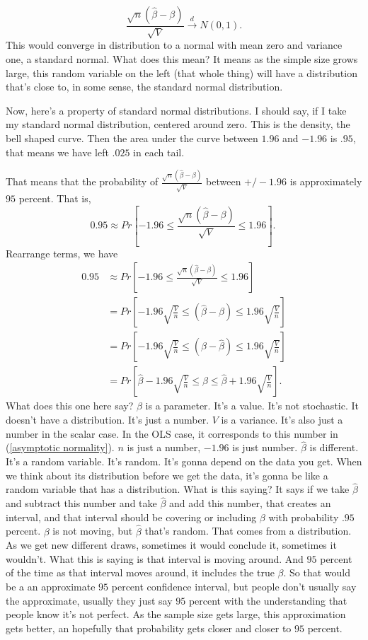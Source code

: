 \documentclass[11pt,a4paper]{amsart}
\theoremstyle{plain}
\theoremstyle{definition}
\begin{document}
	\[		\frac{\sqrt{n}(\hat{\beta} - \beta)}{\sqrt{V}} \stackrel{d}{\longrightarrow} N(0,1).	\]
	This would converge in distribution to a normal with mean zero and variance one, a standard normal. What does this mean? It means as the simple size grows large, this random variable on the left (that whole thing) will have a distribution that's close to, in some sense, the standard normal distribution.\par 
	Now, here's a property of standard normal distributions. I should say, if I take my standard normal distribution, centered around zero. This is the density, the bell shaped curve. Then  the area under the curve between $1 . 96$ and $- 1 . 96$ is $. 95$, that means we have left $.025$ in each tail.\par 
	That means that the probability of $	\frac{\sqrt{n}(\hat{\beta} - \beta)}{\sqrt{V}} $ between $+/- 1.96$ is approximately $95$ percent. That is, 
	\[	0.95 \approx Pr[-1.96 \leq\frac{\sqrt{n}(\hat{\beta} - \beta)}{\sqrt{V}} \leq 1.96 ].\	\]
	Rearrange terms, we have 
	\[	\begin{aligned}
	0.95 &\approx Pr[-1.96 \leq\frac{\sqrt{n}(\hat{\beta} - \beta)}{\sqrt{V}} \leq 1.96 ] \\
	&= Pr[-1.96 \sqrt{\frac{V}{n}} \leq (\hat{\beta} - \beta)\leq 1.96 \sqrt{\frac{V}{n}} ] \\
	&= Pr[-1.96 \sqrt{\frac{V}{n}} \leq (\beta - \hat{\beta})\leq 1.96 \sqrt{\frac{V}{n}} ] \\
	&= Pr[ \hat{\beta}-1.96 \sqrt{\frac{V}{n}} \leq \beta \leq \hat{\beta} + 1.96 \sqrt{\frac{V}{n}} ].
	\end{aligned}
	\]
	What does this one here say? $\beta$ is a parameter. It's a value. It's not stochastic. It doesn't have a distribution. It's just a number. $V$ is a variance. It's also just a number in the scalar case. In the OLS case, it corresponds to this number in (\ref{asymptotic normality}). $n$ is just a number, $- 1 . 96$ is just number. $\hat{\beta}$ is different. It's a random variable. It's random. It's gonna depend on the data you get. When we think about its distribution before we get the data, it's gonna be like a random variable that has a distribution. What is this saying? It says if we take $\hat{\beta}$ and subtract this number and take $\hat{\beta}$ and add this number, that creates an interval, and that interval should be covering or including $\beta$ with probability $.95$ percent. $\beta$ is not moving, but $\hat{\beta}$ that's random. That comes from a distribution. As we get new different draws,  sometimes it would conclude it, sometimes it wouldn't. What this is saying is that interval is moving around. And $95$ percent of the time as that interval moves around, it includes the true $\beta$. So that would be a an approximate $95$ percent confidence interval, but people don't usually say the approximate, usually they just say $95$ percent with the understanding that people know it's not perfect. As the sample size gets large, this approximation gets better, an hopefully that probability gets closer and closer to $95$ percent.\par 
\end{document}
